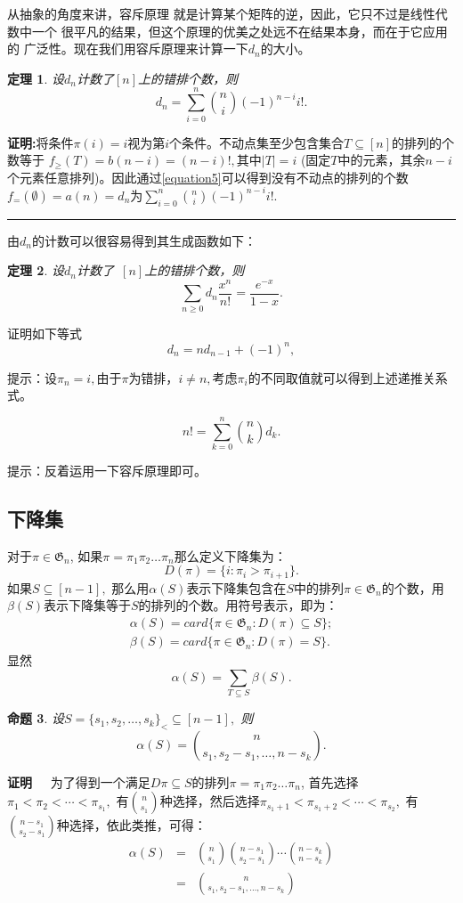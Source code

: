 \documentclass[a4paper,11pt,twoside]{book}
\newtheorem{thm}{定理}[section]
\newtheorem{prop}[thm]{命题}
\def\qed{\nopagebreak\hfill{\rule{4pt}{7pt}}\medbreak}
\def\pf{{\bf 证明~~ }}
\begin{document}
从抽象的角度来讲，容斥原理
就是计算某个矩阵的逆，因此，它只不过是线性代数中一个
很平凡的结果，但这个原理的优美之处远不在结果本身，而在于它应用的
广泛性。现在我们用容斥原理来计算一下$d_n$的大小。

\begin{thm}
设$d_n$计数了$[n]$上的错排个数，则$$d_n=\sum_{i=0}^n{n\choose
i}(-1)^{n-i}i!.$$
\end{thm}
{\bf
证明:}将条件$\pi(i)=i$视为第$i$个条件。不动点集至少包含集合$T\subseteq
[n]$的排列的个数等于 $f_{\geq}(T)=b(n-i)=(n-i)!,$其中$|T|=i$
(固定$T$中的元素，其余$n-i$个元素任意排列)。因此通过\ref{equation5}可以得到没有不动点的排列的个数
$f_{=}(\emptyset)=a(n)=d_n$为$\sum_{i=0}^n{n\choose
i}(-1)^{n-i}i!.$\qed

由$d_n$的计数可以很容易得到其生成函数如下：
\begin{thm}
设$d_n$计数了~$[n]$上的错排个数，则
$$\sum_{n\ge0}d_n\frac{x^n}{n!}=\frac{e^{-x}}{1-x}.$$
\end{thm}


证明如下等式
$$d_n=nd_{n-1}+(-1)^n,$$

提示：设$\pi_n=i,$由于$\pi$为错排，$i\neq
n,$考虑$\pi_i$的不同取值就可以得到上述递推关系式。

$$n!=\sum_{k=0}^n{n\choose k}d_k.$$

提示：反着运用一下容斥原理即可。

\subsection{下降集}
对于$\pi\in\mathfrak{G}_n$,
如果$\pi=\pi_1\pi_2\ldots\pi_n$那么定义下降集为：
$$D(\pi)=\{i:\pi_i>\pi_{i+1}\}.$$
如果$S\subseteq[n-1],$
那么用$\alpha(S)$表示下降集包含在$S$中的排列$\pi\in\mathfrak{G}_n$的个数，用
$\beta(S)$表示下降集等于$S$的排列的个数。用符号表示，即为：
\begin{eqnarray*}
\alpha(S)=card\{\pi\in\mathfrak{G}_n:D(\pi)\subseteq S\};\\
\beta(S)=card\{\pi\in\mathfrak{G}_n:D(\pi)=S\}.
\end{eqnarray*}
显然
$$\alpha(S)=\sum_{T\subseteq S}\beta(S).$$
\begin{prop}
设$S=\{s_1,s_2,\ldots,s_k\}_<\subseteq[n-1],$ 则
$$\alpha(S)={n\choose s_1,s_2-s_1,\ldots,n-s_k}.$$
\end{prop}
\pf 为了得到一个满足$D{\pi}\subseteq
S$的排列$\pi=\pi_1\pi_2\ldots\pi_n$,
首先选择$\pi_1<\pi_2<\cdots<\pi_{s_1},$
 有${n\choose s_1}$种选择，然后选择$\pi_{s_1+1}<\pi_{s_1+2}<\cdots<\pi_{s_2},$ 有${n-s_1\choose s_2-s_1}$种选择，依此类推，可得：
 \begin{eqnarray*}
 \alpha(S)&=&{n\choose s_1}{n-s_1\choose s_2-s_1}\cdots{n-s_k\choose n-s_k}\\
 &=&{n\choose s_1,s_2-s_1,\ldots,n-s_k}
 \end{eqnarray*}
\end{document}
